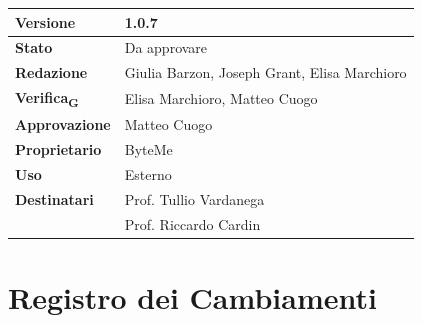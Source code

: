 \documentclass[11pt,a4paper]{article}
\newcommand{\gls}[1]{#1\textsubscript{G}}
\begin{document}
\begin{titlepage}
    \begin{table}[H]
        \centering
        \begin{tabular}{|l|p{5cm}|}
            \hline
            \textbf{Versione} & 1.0.7 \\
            \hline
            \textbf{Stato} & Da approvare \\
            \hline
            \textbf{Redazione} & Giulia Barzon, Joseph Grant, Elisa Marchioro \\
            \hline
            \textbf{\gls{Verifica}} & Elisa Marchioro, Matteo Cuogo \\
            \hline
            \textbf{Approvazione} & Matteo Cuogo \\
            \hline
            \textbf{Proprietario} & ByteMe \\
            \hline
            \textbf{Uso} & Esterno \\
            \hline
            \textbf{Destinatari} & Prof. Tullio Vardanega \\ & Prof. Riccardo Cardin \\
            \hline
        \end{tabular}
    \end{table}
    
    \vfill
\end{titlepage}

\section*{Registro dei Cambiamenti}
\end{document}
